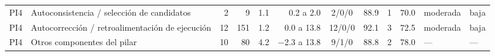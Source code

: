 \begin{table}[!tbp]
\begin{tabularx}{\textwidth}{@{}l >{\raggedright\arraybackslash}X r r r r c r r r l l@{}}
PI4 & Auto\-consistencia / selección de candidatos & 2 & 9 & \num{1.1} & \num{0.2} a \num{2.0} & 2/0/0 & \num{88.9} & 1 & \num{70.0} & moderada & baja \\
PI4 & Autocorrección / retroalimentación de ejecución & 12 & 151 & \num{1.2} & \num{0.0} a \num{13.8} & 12/0/0 & \num{92.1} & 3 & \num{72.5} & moderada & baja \\
PI4 & Otros componentes del pilar & 10 & 80 & \num{4.2} & \num{-2.3} a \num{13.8} & 9/1/0 & \num{88.8} & 2 & \num{78.0} & --- & --- \\
\bottomrule
\end{tabularx}
\end{table}
